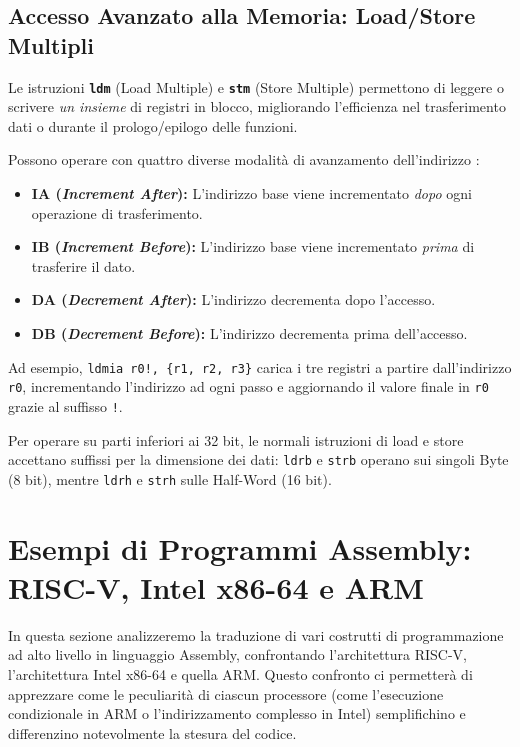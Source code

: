 \documentclass[12pt, a4paper]{article}
\begin{document}
\subsection{Accesso Avanzato alla Memoria: Load/Store Multipli}
Le istruzioni \texttt{\textbf{ldm}} (Load Multiple) e \texttt{\textbf{stm}} (Store Multiple) permettono di leggere o scrivere \textit{un insieme} di registri in blocco, migliorando l'efficienza nel trasferimento dati o durante il prologo/epilogo delle funzioni. 

Possono operare con quattro diverse modalità di avanzamento dell'indirizzo :
\begin{itemize}
    \item \textbf{IA (\textit{Increment After}):} L'indirizzo base viene incrementato \textit{dopo} ogni operazione di trasferimento.
    \item \textbf{IB (\textit{Increment Before}):} L'indirizzo base viene incrementato \textit{prima} di trasferire il dato.
    \item \textbf{DA (\textit{Decrement After}):} L'indirizzo decrementa dopo l'accesso.
    \item \textbf{DB (\textit{Decrement Before}):} L'indirizzo decrementa prima dell'accesso.
\end{itemize}
Ad esempio, \texttt{ldmia r0!, \{r1, r2, r3\}} carica i tre registri a partire dall'indirizzo \texttt{r0}, incrementando l'indirizzo ad ogni passo e aggiornando il valore finale in \texttt{r0} grazie al suffisso \texttt{!}.

Per operare su parti inferiori ai 32 bit, le normali istruzioni di load e store accettano suffissi per la dimensione dei dati: \texttt{ldrb} e \texttt{strb} operano sui singoli Byte (8 bit), mentre \texttt{ldrh} e \texttt{strh} sulle Half-Word (16 bit).
\section{Esempi di Programmi Assembly: RISC-V, Intel x86-64 e ARM}

In questa sezione analizzeremo la traduzione di vari costrutti di programmazione ad alto livello in linguaggio Assembly, confrontando l'architettura RISC-V, l'architettura Intel x86-64 e quella ARM. Questo confronto ci permetterà di apprezzare come le peculiarità di ciascun processore (come l'esecuzione condizionale in ARM o l'indirizzamento complesso in Intel) semplifichino e differenzino notevolmente la stesura del codice.
\end{document}
